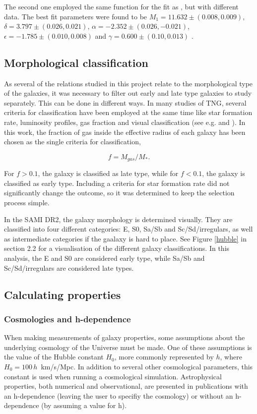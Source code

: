 The second one employed the same function for the fit as \textcite{Behroozi2013}, but with different data. The best fit parameters were found to be $M_1 = 11.632\pm(0.008, 0.009)$, $\delta = 3.797 \pm (0.026, 0.021)$, $\alpha = -2.352 \pm (0.026, -0.021)$, $\epsilon = -1.785 \pm (0.010, 0.008)$  and $\gamma = 0.600 \pm (0.10, 0.013)$ \parencite{Zanisi2019}.

\subsection{Morphological classification}
As several of the relations studied in this project relate to the morphological type of the galaxies, it was necessary to filter out early and late type galaxies to study separately. This can be done in different ways. In many studies of TNG, several criteria for classification have been employed at the same time like star formation rate, luminosity profiles, gas fraction and visual classification (see e.g. \textcite{Lu2020} and \textcite{Genel2017}). In this work, the fraction of gas inside the effective radius of each galaxy has been chosen as the single criteria for classification, 

\begin{equation}
    f = M_{gas}/M_*.
\end{equation}

For $f > 0.1$, the galaxy is classified as late type, while for $f< 0.1$, the galaxy is classified as early type. Including a criteria for star formation rate did not significantly change the outcome, so it was determined to keep the selection process simple.

In the SAMI DR2, the galaxy morphology is determined visually. They are classified into four different categories: E, S0, Sa/Sb and Sc/Sd/irregulars, as well as intermediate categories if the gaalaxy is hard to place. See Figure \ref{hubble} in section 2.2 for a visualisation of the different galaxy classifications. In this analysis, the E and S0 are considered early type, while Sa/Sb and Sc/Sd/irregulars are considered late types.

\subsection{Calculating properties}

\subsubsection{Cosmologies and h-dependence} \label{cosmologies}
When making measurements of galaxy properties, some assumptions about the underlying cosmology of the Universe must be made. One of these assumptions is the value of the Hubble constant $H_0$, more commonly represented by $h$, where $H_0 = 100\,h\,$ km/s/Mpc. In addition to several other cosmological parameters, this constant is used when running a cosmological simulation. Astrophysical properties, both numerical and observational, are presented in publications with an h-dependence (leaving the user to specifiy the cosmology) or without an h-dependence (by assuming a value for h).

